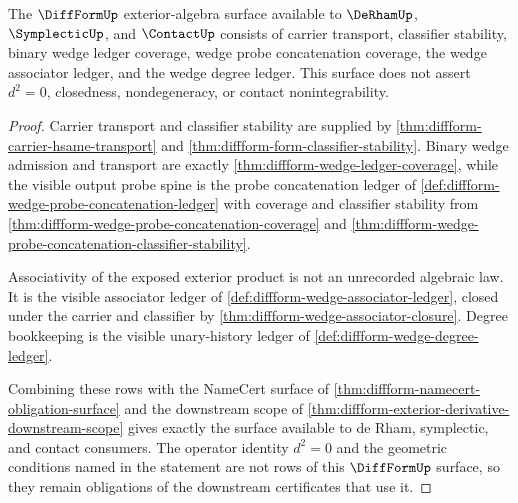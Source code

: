 \begin{theorem}
\label{thm:diffform-exterior-algebra-obligation-surface}
The $\DiffFormUp$ exterior-algebra surface available to $\DeRhamUp$,
$\SymplecticUp$, and $\ContactUp$ consists of carrier transport, classifier
stability, binary wedge ledger coverage, wedge probe concatenation coverage,
the wedge associator ledger, and the wedge degree ledger. This surface does
not assert $d^2=0$, closedness, nondegeneracy, or contact nonintegrability.
\end{theorem}
\begin{proof}
Carrier transport and classifier stability are supplied by
\autoref{thm:diffform-carrier-hsame-transport} and
\autoref{thm:diffform-form-classifier-stability}. Binary wedge admission and
transport are exactly \autoref{thm:diffform-wedge-ledger-coverage}, while the
visible output probe spine is the probe concatenation ledger of
\autoref{def:diffform-wedge-probe-concatenation-ledger} with coverage and
classifier stability from
\autoref{thm:diffform-wedge-probe-concatenation-coverage} and
\autoref{thm:diffform-wedge-probe-concatenation-classifier-stability}.

Associativity of the exposed exterior product is not an unrecorded algebraic
law. It is the visible associator ledger of
\autoref{def:diffform-wedge-associator-ledger}, closed under the carrier and
classifier by \autoref{thm:diffform-wedge-associator-closure}. Degree
bookkeeping is the visible unary-history ledger of
\autoref{def:diffform-wedge-degree-ledger}.

Combining these rows with the NameCert surface of
\autoref{thm:diffform-namecert-obligation-surface} and the downstream scope
of \autoref{thm:diffform-exterior-derivative-downstream-scope} gives exactly
the surface available to de Rham, symplectic, and contact consumers. The
operator identity $d^2=0$ and the geometric conditions named in the statement
are not rows of this $\DiffFormUp$ surface, so they remain obligations of the
downstream certificates that use it.
\end{proof}


